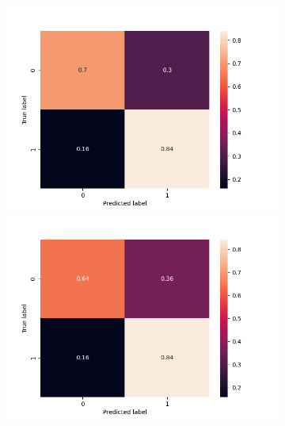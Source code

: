 \begin{figure}
\begin{subfigure}[b]{\textwidth}
    \endminipage\hfill
      \includegraphics[width=\linewidth]{figures/results/word_embeddings/nn/calibrate/calibrate_set_2_confusion_matrix_percent.png}
    \endminipage\hfill {}%
      \includegraphics[width=\linewidth]{figures/results/word_embeddings/nn/calibrate/calibrate+_set_3_confusion_matrix_percent.png}
    \endminipage
    
    \medskip
    

\end{subfigure}
\end{figure}
